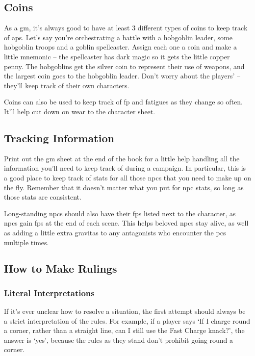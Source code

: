 \begin{multicols}{2}
\subsection{Coins}

As a \gls{gm}, it's always good to have at least 3 different types of coins to keep track of \glspl{ap}.
Let's say you're orchestrating a battle with a hobgoblin leader, some hobgoblin troops and a goblin spellcaster.
Assign each one a coin and make a little mnemonic -- the spellcaster has dark magic so it gets the little copper penny.
The hobgoblins get the silver coin to represent their use of weapons, and the largest coin goes to the hobgoblin leader.
Don't worry about the players'  -- they'll keep track of their own characters.

Coins can also be used to keep track of \gls{fp} and \glspl{fatigue} as they change so often.
It'll help cut down on wear to the character sheet.

\subsection{Tracking Information}

Print out the \gls{gm} sheet at the end of the book for a little help handling all the information you'll need to keep track of during a campaign.
In particular, this is a good place to keep track of stats for all those \glspl{npc} that you need to make up on the fly.
Remember that it doesn't matter what you put for \gls{npc} stats, so long as those stats are consistent.

Long-standing \glspl{npc} should also have their \glspl{fp} listed next to the character, as \glspl{npc} gain \glspl{fp} at the end of each scene.
This helps beloved \glspl{npc} stay alive, as well as adding a little extra gravitas to any antagonists who encounter the \glspl{pc} multiple times.

\subsection{How to Make Rulings}

\subsubsection{Literal Interpretations}

If it's ever unclear how to resolve a situation, the first attempt should always be a strict interpretation of the rules.
For example, if a player says `If I charge round a corner, rather than a straight line, can I still use the Fast Charge knack?', the answer is `yes', because the rules as they stand don't prohibit going round a corner.


\end{multicols}
